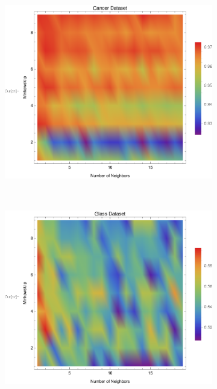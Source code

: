 \documentclass{article}
\begin{document}
			\begin{figure}[h!]
				\centering
				\begin{subfigure}[b]{0.32\textwidth}
					\centering
					\includegraphics[width=\textwidth]{figs/kNN/cancer_plot_kp}	
					\caption{}
					\label{kp_cancer}				
				\end{subfigure}	\	
				\begin{subfigure}[b]{0.32\textwidth}
					\centering
					\includegraphics[width=\textwidth]{figs/kNN/glass_plot_kp}
					\caption{}
					\label{kp_glass}					

\end{subfigure}
\end{figure}
\end{document}
